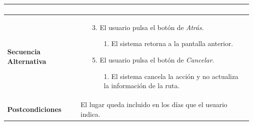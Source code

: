 \begin{longtable}{| p{4cm} | p{10cm} |}
\begin{enumerate}[leftmargin=0.7cm, topsep=0.1cm]
\end{enumerate}


\\
\hline
\textbf{Secuencia Alternativa} &\mbox{}\par\vspace{-\baselineskip}
\begin{enumerate}[leftmargin=0.9cm, topsep=0.1cm]
\item[3.] El usuario pulsa el botón de \textit{Atrás}.
	\begin{itemize}
	\item[1.] El sistema retorna a la pantalla anterior.
	\end{itemize}
\item[5.] El usuario pulsa el botón de \textit{Cancelar}.
	\begin{itemize}
	\item[1.] El sistema cancela la acción y no actualiza la información de la ruta.
	\end{itemize}
\end{enumerate}
\\

\hline
\textbf{Postcondiciones} & 
El lugar queda incluido en los días que el usuario indica.\\
\hline
\end{longtable}



\newpage
